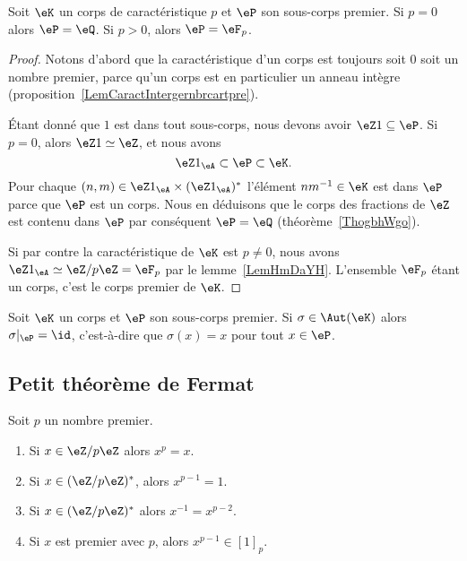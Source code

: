 \begin{proposition}
	Soit \( \eK\) un corps de caractéristique \( p\) et \( \eP\) son sous-corps premier. Si \( p=0\) alors \( \eP=\eQ\). Si \( p>0\), alors \( \eP=\eF_p\).
\end{proposition}

\begin{proof}
	Notons d'abord que la caractéristique d'un corps est toujours soit 0 soit un nombre premier, parce qu'un corps est en particulier un anneau intègre (proposition~\ref{LemCaractIntergernbrcartpre}).

	Étant donné que \( 1\) est dans tout sous-corps, nous devons avoir \( \eZ 1\subseteq \eP\). Si \( p=0\), alors \( \eZ 1\simeq \eZ\), et nous avons
	\begin{equation}
		\eZ 1_{\eA}\subset \eP\subset \eK.
	\end{equation}
	Pour chaque \( (n,m)\in \eZ 1_{\eA}\times (\eZ 1_{\eA})^*\) l'élément \( nm^{-1}\in \eK\) est dans \( \eP\) parce que \( \eP\) est un corps. Nous en déduisons que le corps des fractions de \( \eZ\) est contenu dans \( \eP\) par conséquent \( \eP=\eQ\) (théorème~\ref{ThogbhWgo}).

	Si par contre la caractéristique de \( \eK\) est \( p\neq 0\), nous avons \( \eZ 1_{\eA}\simeq\eZ/p\eZ=\eF_p\) par le lemme~\ref{LemHmDaYH}. L'ensemble \( \eF_p\) étant un corps, c'est le corps premier de \( \eK\).
\end{proof}

\begin{proposition}     \label{PropqPPrgJ}
	Soit \( \eK\) un corps et \( \eP\) son sous-corps premier. Si \( \sigma\in\Aut(\eK)\) alors \( \sigma|_{\eP}=\id\), c'est-à-dire que $\sigma(x)=x$ pour tout \( x\in \eP\).
\end{proposition}

\subsection{Petit théorème de Fermat}

\begin{theorem}       \label{ThoOPQOiO}
	Soit \( p\) un nombre premier.
	\begin{enumerate}
		\item
		      Si \( x\in \eZ/p\eZ\) alors \( x^p=x\).
		\item
		      Si \( x\in(\eZ/p\eZ)^*\), alors \( x^{p-1}=1\).
		\item
		      Si \( x\in (\eZ/p\eZ)^*\) alors \( x^{-1}=x^{p-2}\).
		\item       \label{ITEMooRNIVooOIzqgc}
		      Si \( x\) est premier avec \( p\), alors \( x^{p-1}\in [1]_p\).
	\end{enumerate}
\end{theorem}

